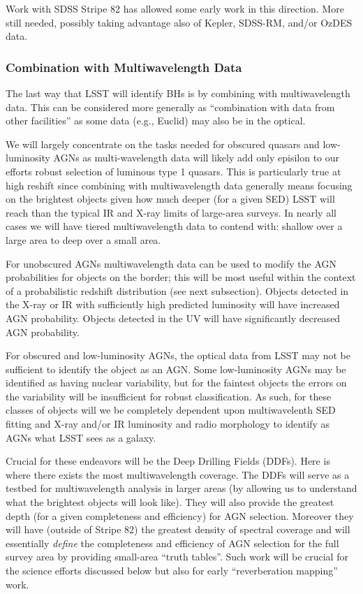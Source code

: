 Work with SDSS Stripe 82 has allowed some early work in this
direction.  More still needed, possibly taking advantage also of
Kepler, SDSS-RM, and/or OzDES data.


\subsubsection{Combination with Multiwavelength Data}

The last way that LSST will identify BHs is by combining with multiwavelength data.  This can be considered more generally as ``combination with data from other facilities'' as some data (e.g., Euclid) may also be in the optical.

We will largely concentrate on the tasks needed for obscured quasars and low-luminosity AGNs as multi-wavelength data will likely add only episilon to our efforts robust selection of luminous type 1 quasars.  This is particularly true at high reshift since combining with multiwavelength data generally means focusing on the brightest objects given how much deeper (for a given SED) LSST will reach than the typical IR and X-ray limits of large-area surveys.  In nearly all cases we will have tiered multiwavelength data to contend with: shallow over a large area to deep over a small area.

For unobscured AGNs multiwavelength data can be used to modify the AGN probabilities for objects on the border; this will be most useful within the context of a probabilistic redshift distribution (see next subsection).  Objects detected in the X-ray or IR with sufficiently high predicted luminosity will have increased AGN probability.  Objects detected in the UV will have significantly decreased AGN probability.

For obscured and low-luminosity AGNs, the optical data from LSST may not be sufficient to identify the object as an AGN.  Some low-luminosity AGNs may be identified as having nuclear variability, but for the faintest objects the errors on the variability will be insufficient for robust classification.  As such, for these classes of objects will we be completely dependent upon multiwavelenth SED fitting and X-ray and/or IR luminosity and radio morphology to identify as AGNs what LSST sees as a galaxy.

Crucial for these endeavors will be the Deep Drilling Fields (DDFs).  Here is where there exists the most multiwavelength coverage.  The DDFs will serve as a testbed for multiwavelength analysis in larger areas (by allowing us to understand what the brightest objects will look like).  They will also provide the greatest depth (for a given completeness and efficiency) for AGN selection.  Moreover they will have (outside of Stripe 82) the greatest density of spectral coverage and will essentially {\em define} the completeness and efficiency of AGN selection for the full survey area by providing small-area ``truth tables''.  Such work will be crucial for the science efforts discussed below but also for early ``reverberation mapping'' work.

